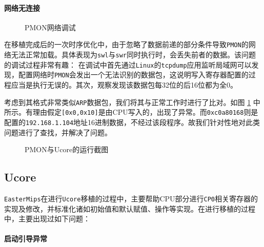 \hypertarget{ux7f51ux7edcux65e0ux6cd5ux4e0aux7ebf}{%
\paragraph{网络无连接}\label{ux7f51ux7edcux65e0ux6cd5ux4e0aux7ebf}}

\begin{figure}[ht]
	\centering
	\quad
	\caption{PMON网络调试}
	\label{fig:network-debug}
\end{figure}

在移植完成后的一次时序优化中，由于忽略了数据前递的部分条件导致\texttt{PMON}的网络无法正常加载。具体表现为\texttt{swl}与\texttt{swr}同时执行时，会丢失前者的数据。该问题的调试过程非常有趣：
在调试中首先通过\texttt{Linux}的\texttt{tcpdump}应用监听局域网可以发现，配置网络时\texttt{PMON}会发出一个无法识别的数据包，这说明写入寄存器配置的过程应当是执行无误的。其次，观察发现该数据包每32位的后16位都为全0。

考虑到其格式非常类似\texttt{ARP}数据包，我们将其与正常工作时进行了比对。如图 \ref{fig:network-debug} 中所示。有理由假定\texttt{{[}0x0,0x10{]}}是由CPU写入的，出现了异常。而\texttt{0xc0a80168}则是配置的\texttt{192.168.1.104}地址16进制数据，不经过该段程序。故我们针对性地对此类问题进行了查找，并解决了问题。

\begin{figure}[ht]
	\centering
	\quad
	\caption{PMON与Ucore的运行截图}
	\label{fig:pmon-and-ucore}
\end{figure}

\hypertarget{ucore}{%
\subsection{Ucore}\label{ucore}}

\texttt{EasterMips}在进行\texttt{Ucore}移植的过程中，主要帮助CPU部分进行\texttt{CP0}相关寄存器的实现及修改，并标准化诸如初始值和默认赋值、操作等实现。在进行移植的过程中，主要出现过如下问题：

\hypertarget{ux542fux52a8ux7a0bux5e8fux5f02ux5e38}{%
\paragraph{启动引导异常}\label{ux542fux52a8ux7a0bux5e8fux5f02ux5e38}}

